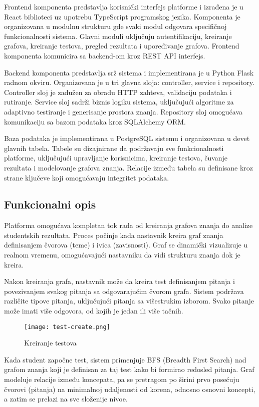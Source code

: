 \documentclass[conference]{IEEEtran}
\begin{document}
Frontend komponenta predstavlja korisnički interfejs platforme i izrađena je u React biblioteci uz upotrebu TypeScript programskog jezika. Komponenta je organizovana u modulnu strukturu gde svaki modul odgovara specifičnoj funkcionalnosti sistema. Glavni moduli uključuju autentifikaciju, kreiranje grafova, kreiranje testova, pregled rezultata i upoređivanje grafova. Frontend komponenta komunicira sa backend-om kroz REST API interfejs.

Backend komponenta predstavlja srž sistema i implementirana je u Python Flask radnom okviru. Organizovana je u tri glavna sloja: controller, service i repository. Controller sloj je zadužen za obradu HTTP zahteva, validaciju podataka i rutiranje. Service sloj sadrži biznis logiku sistema, uključujući algoritme za adaptivno testiranje i generisanje prostora znanja. Repository sloj omogućava komunikaciju sa bazom podataka kroz SQLAlchemy ORM.

Baza podataka je implementirana u PostgreSQL sistemu i organizovana u devet glavnih tabela. Tabele su dizajnirane da podržavaju sve funkcionalnosti platforme, uključujući upravljanje korisnicima, kreiranje testova, čuvanje rezultata i modelovanje grafova znanja. Relacije između tabela su definisane kroz strane ključeve koji omogućavaju integritet podataka.

\subsection{Funkcionalni opis}

Platforma omogućava kompletan tok rada od kreiranja grafova znanja do analize studentskih rezultata. Proces počinje kada nastavnik kreira graf znanja definisanjem čvorova (teme) i ivica (zavisnosti). Graf se dinamički vizualizuje u realnom vremenu, omogućavajući nastavniku da vidi strukturu znanja dok je kreira.

Nakon kreiranja grafa, nastavnik može da kreira test definisanjem pitanja i povezivanjem svakog pitanja sa odgovarajućim čvorom grafa. Sistem podržava različite tipove pitanja, uključujući pitanja sa višestrukim izborom. Svako pitanje može imati više odgovora, od kojih je jedan ili više tačnih.

\begin{figure*}[ht]
\centering
\texttt{[image: test-create.png]}
\caption{Kreiranje testova}
\label{fig:graf_programiranja}
\end{figure*}

Kada student započne test, sistem primenjuje BFS (Breadth First Search) nad grafom znanja koji je definisan za taj test kako bi formirao redosled pitanja. Graf modeluje relacije između koncepata, pa se pretragom po širini prvo posećuju čvorovi (pitanja) na minimalnoj udaljenosti od korena, odnosno osnovni koncepti, a zatim se prelazi na sve složenije nivoe.
\end{document}
